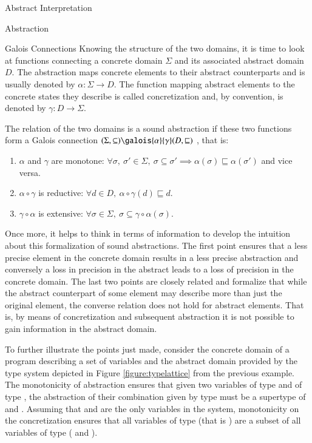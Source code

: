 \begin{chapter}{Abstract Interpretation}
\begin{section}{Abstraction}
		\begin{subsection}{Galois Connections}
			Knowing the structure of the two domains, it is time to look at functions connecting a concrete domain $\Sigma$ and its associated abstract domain $D$. The abstraction maps concrete elements to their abstract counterparts and is usually denoted by $\alpha: \Sigma \to D$. The function mapping abstract elements to the concrete states they describe is called concretization and, by convention, is denoted by $\gamma: D \to \Sigma$.
			
			\begin{definition}
				\label{definition:GaloisConnection}
				The relation of the two domains is a sound abstraction if these two functions form a Galois connection $(\Sigma, \subseteq) \galois{\alpha}{\gamma} (D, \sqsubseteq)$ , that is:
				\begin{enumerate}
					\item $\alpha$ and $\gamma$ are monotone: $\forall \sigma, \ \sigma' \in \Sigma, \ \sigma \subseteq \sigma' \implies \alpha(\sigma) \sqsubseteq \alpha(\sigma')$ and vice versa.
					\item $\alpha \circ \gamma$ is reductive: $\forall d \in D, \ \alpha \circ \gamma(d) \sqsubseteq d$. 
					\item $\gamma \circ \alpha$ is extensive: $\forall \sigma \in \Sigma, \ \sigma \subseteq \gamma \circ \alpha(\sigma)$.
				\end{enumerate}
			\end{definition}

 			Once more, it helps to think in terms of information to develop the intuition about this formalization of sound abstractions. The first point ensures that a less precise element in the concrete domain results in a less precise abstraction and conversely a loss in precision in the abstract leads to a loss of precision in the concrete domain. The last two points are closely related and formalize that while the abstract counterpart of some element may describe more than just the original element, the converse relation does not hold for abstract elements. That is, by means of concretization and subsequent abstraction it is not possible to gain information in the abstract domain.

			\begin{example}
				To further illustrate the points just made, consider the concrete domain of a program describing a set of variables and the abstract domain provided by the type system depicted in Figure \ref{figure:typelattice} from the previous example. The monotonicity of abstraction ensures that given two variables  of type  and  of type , the abstraction of their combination given by type  must be a supertype of  and . Assuming that  and  are the only variables in the system, monotonicity on the concretization ensures that all variables of type  (that is ) are a subset of all variables of type  ( and ).


\end{example}
\end{subsection}
\end{section}
\end{chapter}
